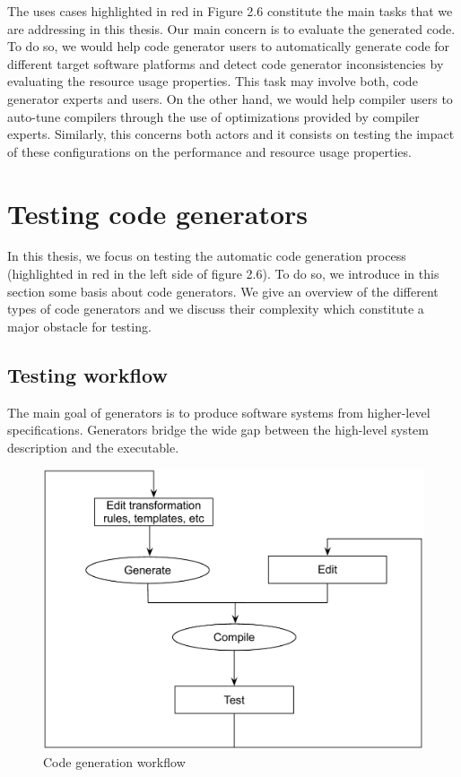 The uses cases highlighted in red in Figure 2.6 constitute the main tasks that we are addressing in this thesis. Our main concern is to evaluate the generated code. To do so, we would help code generator users to automatically generate code for different target software platforms and detect code generator inconsistencies by evaluating the resource usage properties. This task may involve both, code generator experts and users.
On the other hand, we would help compiler users to auto-tune compilers through the use of optimizations provided by compiler experts. Similarly, this concerns both actors and it consists on testing the impact of these configurations on the performance and resource usage properties.


\section{Testing code generators}
In this thesis, we focus on testing the automatic code generation process (highlighted in red in the left side of figure 2.6). To do so, we introduce in this section some basis about code generators. We give an overview of the different types of code generators and we discuss their complexity which constitute a major obstacle for testing.
\subsection{Testing workflow}
The main goal of generators is to produce software systems from higher-level specifications. Generators bridge the wide gap between the high-level system description and the executable.
\begin{figure}[h]
	\center
	\includegraphics[scale=1]{Background/fig/workflow}
	\caption{Code generation workflow}
\end{figure}

